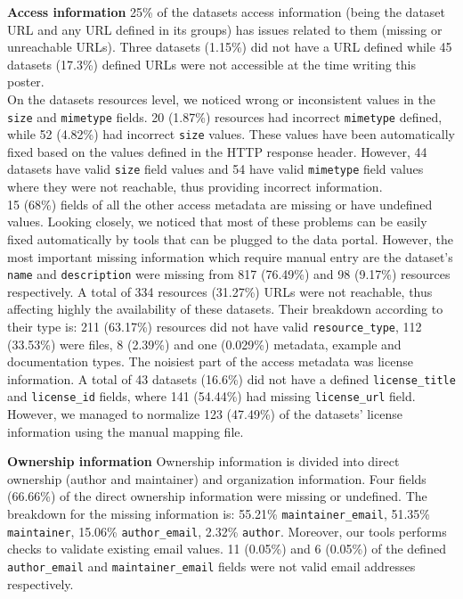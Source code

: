 \documentclass{sig-alternate}
\begin{document}
\textbf{Access information} 25\% of the datasets access information (being the dataset URL and any URL defined in its groups) has issues related to them (missing or unreachable URLs).
Three datasets (1.15\%) did not have a URL defined while 45 datasets (17.3\%) defined URLs were not accessible at the time writing this poster.\\
On the datasets resources level, we noticed wrong or inconsistent values in the \texttt{size} and \texttt{mimetype} fields. 20 (1.87\%) resources had incorrect \texttt{mimetype} defined, while 52 (4.82\%) had incorrect \texttt{size} values. These values have been automatically fixed based on the values defined in the HTTP response header. However, 44 datasets have valid \texttt{size} field values and 54 have valid \texttt{mimetype} field values where they were not reachable, thus providing incorrect information.\\
15 (68\%) fields of all the other access metadata are missing or have undefined values. Looking closely, we noticed that most of these problems can be easily fixed automatically by tools that can be plugged to the data portal. However, the most important missing information which require manual entry are the dataset's \texttt{name} and \texttt{description} were missing from 817 (76.49\%) and 98 (9.17\%) resources respectively.
A total of 334 resources (31.27\%) URLs were not reachable, thus affecting highly the availability of these datasets. Their breakdown according to their type is: 211 (63.17\%) resources did not have valid \texttt{resource\_type}, 112 (33.53\%) were files, 8 (2.39\%) and one (0.029\%) metadata, example and documentation types.
The noisiest part of the access metadata was license information. A total of 43 datasets (16.6\%) did not have a defined \texttt{license\_title} and \texttt{license\_id} fields, where 141 (54.44\%) had missing \texttt{license\_url} field. However, we managed to normalize 123 (47.49\%) of the datasets' license information using the manual mapping file.

\textbf{Ownership information} Ownership information is divided into direct ownership (author and maintainer) and organization information. Four fields (66.66\%) of the direct ownership information were missing or undefined. The breakdown for the missing information is: 55.21\% \texttt{maintainer\_email}, 51.35\% \texttt{maintainer}, 15.06\% \texttt{author\_email}, 2.32\% \texttt{author}. Moreover, our tools performs checks to validate existing email values. 11 (0.05\%) and 6 (0.05\%) of the defined \texttt{author\_email} and \texttt{maintainer\_email} fields were not valid email addresses respectively.
\end{document}

